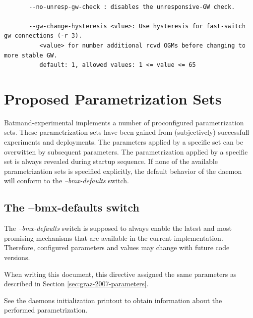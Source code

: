 \documentclass[11pt]{article}
\begin{document}
\begin{small} \begin{verbatim}

       --no-unresp-gw-check : disables the unresponsive-GW check.

       --gw-change-hysteresis <vlue>: Use hysteresis for fast-switch gw connections (-r 3).
          <value> for number additional rcvd OGMs before changing to more stable GW.
          default: 1, allowed values: 1 <= value <= 65

\end{verbatim} \end{small}






\section{Proposed Parametrization Sets}
\label{sec:proposed-parametrizations}

Batmand-experimental implements a number of proconfigured parametrization sets.
These parametrization sets have been gained from (subjectively) successfull experiments and deployments.
The parameters applied by a specific set can be overwitten by subsequent parameters.
The parametrization applied by a specific set is always revealed during startup sequence.
If none of the available parametrization sets is specified explicitly, the default behavior of the daemon will conform to the \emph{--bmx-defaults} switch. 

\subsection{The --bmx-defaults switch}
\label{sec:bmx-defaults}

The \emph{--bmx-defaults} switch is supposed to always enable the latest and most promising mechanisms that are available in the current implementation. 
%
Therefore, configured parameters and values may change with future code versions.

When writing this document, this directive assigned the same parameters as described in Section \ref{sec:graz-2007-parameters}.

See the daemons initialization printout to obtain information about the performed parametrization.
\end{document}
